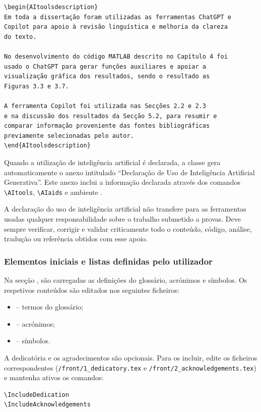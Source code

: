 \begin{verbatim}
\begin{AItoolsdescription}
Em toda a dissertação foram utilizadas as ferramentas ChatGPT e
Copilot para apoio à revisão linguística e melhoria da clareza
do texto.

No desenvolvimento do código MATLAB descrito no Capítulo 4 foi
usado o ChatGPT para gerar funções auxiliares e apoiar a
visualização gráfica dos resultados, sendo o resultado as
Figuras 3.3 e 3.7.

A ferramenta Copilot foi utilizada nas Secções 2.2 e 2.3
e na discussão dos resultados da Secção 5.2, para resumir e
comparar informação proveniente das fontes bibliográficas
previamente selecionadas pelo autor.
\end{AItoolsdescription}
\end{verbatim}

Quando a utilização de inteligência artificial é declarada, a classe gera automaticamente o anexo intitulado ``Declaração de Uso de Inteligência Artificial Generativa''. Este anexo inclui a informação declarada através dos comandos \verb|\AItools|, \verb|\AIaids| e ambiente .

A declaração do uso de inteligência artificial não transfere para as ferramentas usadas qualquer responsabilidade sobre o trabalho submetido a provas. Deve sempre verificar, corrigir e validar criticamente todo o conteúdo, código, análise, tradução ou referência obtidos com esse apoio.

\subsubsection*{Elementos iniciais e listas definidas pelo utilizador}

Na secção , são carregadas as definições do glossário, acrónimos e símbolos. Os respetivos conteúdos são editados nos seguintes ficheiros:
\begin{itemize}
    \item {} -- termos do glossário;
    \item {} -- acrónimos;
    \item {} -- símbolos.
\end{itemize}

A dedicatória e os agradecimentos são opcionais. Para os incluir, edite os ficheiros correspondentes (\verb|/front/1_dedicatory.tex| e \verb|/front/2_acknowledgements.tex|) e mantenha ativos os comandos:
\begin{verbatim}
\IncludeDedication
\IncludeAcknowledgements
\end{verbatim}

